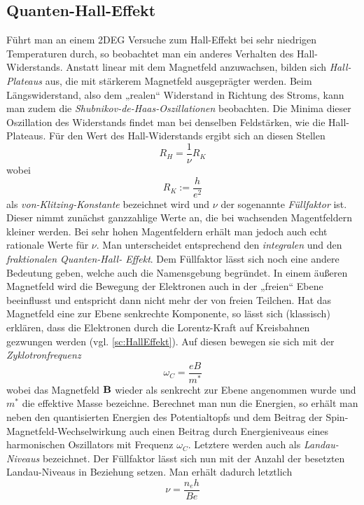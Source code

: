 \subsection{Quanten-Hall-Effekt}
Führt man an einem 2DEG Versuche zum Hall-Effekt bei sehr niedrigen Temperaturen durch, so beobachtet man ein anderes Verhalten des Hall-Widerstands. Anstatt linear mit dem Magnetfeld anzuwachsen, bilden sich \emph{Hall-Plateaus} aus, die mit stärkerem Magnetfeld ausgeprägter werden. Beim Längswiderstand, also dem „realen“ Widerstand in Richtung des Stroms, kann man zudem die \emph{Shubnikov-de-Haas-Oszillationen} beobachten. Die Minima dieser Oszillation des Widerstands findet man bei denselben Feldstärken, wie die Hall-Plateaus. Für den Wert des Hall-Widerstands ergibt sich an diesen Stellen
\begin{equation}\label{eq:HallvKl}
R_H = \frac{1}{\nu}R_K
\end{equation}
wobei
\begin{equation}\label{eq:vKlitzing}
R_K := \frac{h}{e^2}
\end{equation}
als \emph{von-Klitzing-Konstante} bezeichnet wird und $\nu$ der sogenannte \emph{Füllfaktor} ist. Dieser nimmt zunächst ganzzahlige Werte an, die bei wachsenden Magentfeldern kleiner werden. Bei sehr hohen Magentfeldern erhält man jedoch auch echt rationale Werte für $\nu$. Man unterscheidet entsprechend den \emph{integralen} und den \emph{fraktionalen Quanten-Hall-
Effekt}.
Dem Füllfaktor lässt sich noch eine andere Bedeutung geben, welche auch die Namensgebung begründet.
In einem äußeren Magnetfeld wird die Bewegung der Elektronen auch in der „freien“ Ebene beeinflusst und entspricht dann nicht mehr der von freien Teilchen. Hat das Magnetfeld eine zur Ebene senkrechte Komponente, so lässt sich (klassisch) erklären, dass die Elektronen durch die Lorentz-Kraft auf Kreisbahnen gezwungen werden (vgl. \autoref{sc:HallEffekt}). Auf diesen bewegen sie sich mit der \emph{Zyklotronfrequenz}
$$\omega_C = \frac{eB}{m^*}$$
wobei das Magnetfeld $\textbf{B}$ wieder als senkrecht zur Ebene angenommen wurde und $m^*$ die effektive Masse bezeichne. Berechnet man nun die Energien, so erhält man neben den quantisierten Energien des Potentialtopfs und dem Beitrag der Spin-Magnetfeld-Wechselwirkung auch einen Beitrag durch Energieniveaus eines harmonischen Oszillators mit Frequenz $\omega_C$. Letztere werden auch als \emph{Landau-Niveaus} bezeichnet. Der Füllfaktor
lässt sich nun mit der Anzahl der besetzten Landau-Niveaus in Beziehung setzen. Man erhält dadurch letztlich
\begin{equation}\label{eq:Fuellfaktor}
\nu = \frac{n_eh}{Be}
\end{equation}
